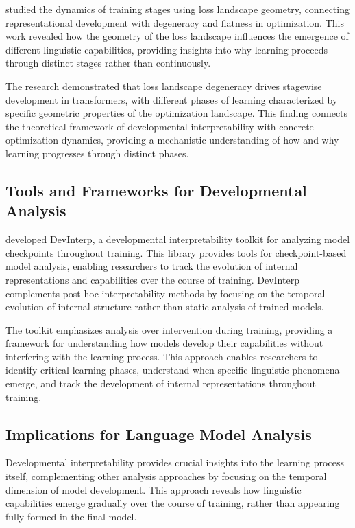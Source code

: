 \citet{hoogland2025losslandscape} studied the dynamics of training stages using loss landscape geometry, connecting representational development with degeneracy and flatness in optimization. This work revealed how the geometry of the loss landscape influences the emergence of different linguistic capabilities, providing insights into why learning proceeds through distinct stages rather than continuously.

The research demonstrated that loss landscape degeneracy drives stagewise development in transformers, with different phases of learning characterized by specific geometric properties of the optimization landscape. This finding connects the theoretical framework of developmental interpretability with concrete optimization dynamics, providing a mechanistic understanding of how and why learning progresses through distinct phases.

\subsection{Tools and Frameworks for Developmental Analysis}

\citet{devinterpcode} developed DevInterp, a developmental interpretability toolkit for analyzing model checkpoints throughout training. This library provides tools for checkpoint-based model analysis, enabling researchers to track the evolution of internal representations and capabilities over the course of training. DevInterp complements post-hoc interpretability methods by focusing on the temporal evolution of internal structure rather than static analysis of trained models.

The toolkit emphasizes analysis over intervention during training, providing a framework for understanding how models develop their capabilities without interfering with the learning process. This approach enables researchers to identify critical learning phases, understand when specific linguistic phenomena emerge, and track the development of internal representations throughout training.

\subsection{Implications for Language Model Analysis}

Developmental interpretability provides crucial insights into the learning process itself, complementing other analysis approaches by focusing on the temporal dimension of model development. This approach reveals how linguistic capabilities emerge gradually over the course of training, rather than appearing fully formed in the final model.

